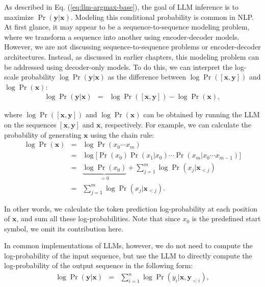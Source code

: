 As described in Eq. (\ref{eq:llm-argmax-base}), the goal of LLM inference is to maximize $\Pr(\mathbf{y}|\mathbf{x})$. Modeling this conditional probability is common in NLP. At first glance, it may appear to be a sequence-to-sequence modeling problem, where we transform a sequence into another using encoder-decoder models. However, we are not discussing sequence-to-sequence problems or encoder-decoder architectures. Instead, as discussed in earlier chapters, this modeling problem can be addressed using decoder-only models. To do this, we can interpret the log-scale probability $\log \Pr(\mathbf{y}|\mathbf{x})$ as the difference between $\log \Pr([\mathbf{x},\mathbf{y}])$ and $\log \Pr(\mathbf{x})$:
\begin{eqnarray}
\log \Pr(\mathbf{y}|\mathbf{x}) & = & \log \Pr([\mathbf{x},\mathbf{y}]) - \log \Pr(\mathbf{x}),
\end{eqnarray}

\noindent where $\log \Pr([\mathbf{x},\mathbf{y}])$ and $\log \Pr(\mathbf{x})$ can be obtained by running the LLM on the sequences $[\mathbf{x},\mathbf{y}]$ and $\mathbf{x}$, respectively. For example, we can calculate the probability of generating $\mathbf{x}$ using the chain rule:
\begin{eqnarray}
\log \Pr(\mathbf{x}) & = & \log \Pr(x_0\cdots x_m) \nonumber \\
                     & = & \log \big[ \Pr(x_0) \Pr(x_1|x_0) \cdots \Pr(x_m|x_0\cdots x_{m-1}) \big] \nonumber \\
                     & = & \underbrace{\log \Pr(x_0)}_{=0} + \sum_{j=1}^{m} \log \Pr(x_j|\mathbf{x}_{<j}) \nonumber \\
                     & = & \sum_{j=1}^{m} \log \Pr(x_j|\mathbf{x}_{<j}).
\end{eqnarray}

\noindent In other words, we calculate the token prediction log-probability at each position of $\mathbf{x}$, and sum all these log-probabilities. Note that since $x_0$ is the predefined start symbol, we omit its contribution here.

In common implementations of LLMs, however, we do not need to compute the log-probability of the input sequence, but use the LLM to directly compute the log-probability of the output sequence in the following form:
\begin{eqnarray}
\log \Pr(\mathbf{y}|\mathbf{x}) & = & \sum_{i=1}^{n} \log \Pr(y_i|\mathbf{x},\mathbf{y}_{<i}), \label{eq:llm-log-prob-y-x-sum}
\end{eqnarray}

